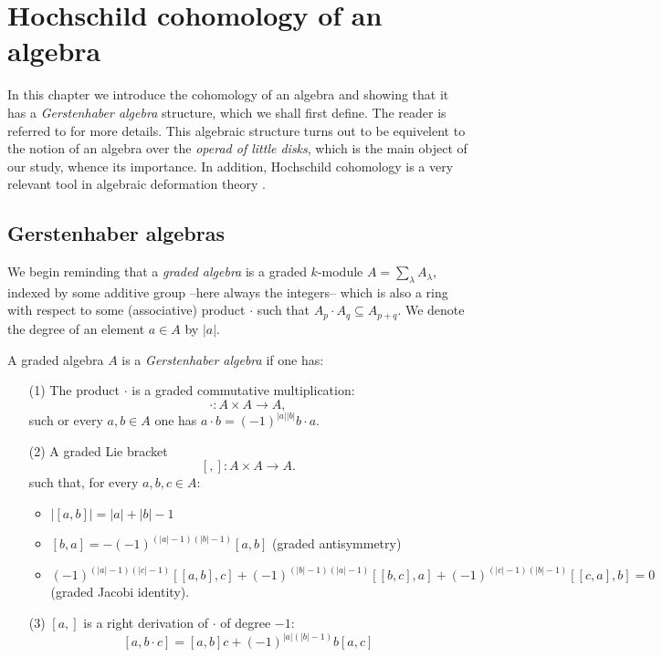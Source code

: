\documentclass[TFM.tex]{subfiles}
\begin{document}
\chapter{Hochschild cohomology of an algebra}

In this chapter we introduce the cohomology of an algebra and showing that it has a \emph{Gerstenhaber algebra} structure, which we shall first define. The reader is referred to \cite{Gerstenhaber} for more details. This algebraic structure turns out to be equivelent to the notion of an algebra over the \emph{operad of little disks}, which is the main object of our study, whence its importance. In addition, Hochschild cohomology is a very relevant tool in algebraic deformation theory \cite{deformation}.


\section{Gerstenhaber algebras}

 We begin reminding that a \emph{graded algebra} is a graded $k$-module  $A=\sum_\lambda A_\lambda$, indexed by some additive group --here always the integers-- which is also a ring with respect to some (associative) product $\cdot$ such that $A_p\cdot A_q\subseteq A_{p+q}$. We denote the degree of an element $a\in A$ by $|a|$. %


\begin{defi}\label{defi1}
A graded algebra $A$ is a \emph{Gerstenhaber algebra} if one has:
\begin{enumerate}
\item[(1)] The product $\cdot$ is a graded commutative multiplication:
\[
\cdot: A\times A\to A,
\]
such or every $a,b\in A$ one has $a\cdot b=(-1)^{|a||b|}b\cdot a$.

\item[(2)] A graded Lie bracket 
\[
[,]:A\times A\to A.
\]
such that, for every $a,b,c\in A$:
\begin{itemize}
\item $|[a,b]|=|a|+|b|-1$
\item $[b,a]=-(-1)^{(|a|-1)(|b|-1)}[a,b]$ (graded antisymmetry)
\item $(-1)^{(|a|-1)(|c|-1)}[[a,b],c]+(-1)^{(|b|-1)(|a|-1)}[[b,c],a]+(-1)^{(|c|-1)(|b|-1)}[[c,a],b]=0$ (graded Jacobi identity). 
\end{itemize}
\item[(3)]  $[a,]$ is a right derivation of $\cdot$ of degree $-1$:%
\[
[a,b\cdot c] = [a,b]c+(-1)^{|a|(|b|-1)}b[a,c]
\]
\end{enumerate}
\end{defi}
\end{document}

